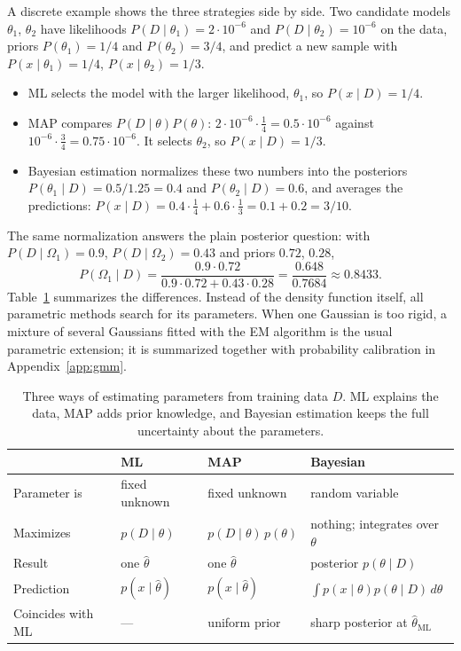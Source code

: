 A discrete example shows the three strategies side by side. Two candidate
models $\theta_1$, $\theta_2$ have likelihoods $P(D\mid\theta_1) = 2\cdot10^{-6}$
and $P(D\mid\theta_2) = 10^{-6}$ on the data, priors $P(\theta_1) = 1/4$ and
$P(\theta_2) = 3/4$, and predict a new sample with
$P(x\mid\theta_1) = 1/4$, $P(x\mid\theta_2) = 1/3$.
\begin{itemize}
  \item ML selects the model with the larger likelihood, $\theta_1$, so
        $P(x\mid D) = 1/4$.
  \item MAP compares $P(D\mid\theta)P(\theta)$:
        $2\cdot10^{-6}\cdot\frac14 = 0.5\cdot10^{-6}$ against
        $10^{-6}\cdot\frac34 = 0.75\cdot10^{-6}$. It selects $\theta_2$, so
        $P(x\mid D) = 1/3$.
  \item Bayesian estimation normalizes these two numbers into the posteriors
        $P(\theta_1\mid D) = 0.5/1.25 = 0.4$ and $P(\theta_2\mid D) = 0.6$, and
        averages the predictions:
        $P(x\mid D) = 0.4\cdot\frac14 + 0.6\cdot\frac13 = 0.1 + 0.2 = 3/10$.
\end{itemize}
\noindent
The same normalization answers the plain posterior question: with
$P(D\mid\Omega_1) = 0.9$, $P(D\mid\Omega_2) = 0.43$ and priors $0.72$, $0.28$,
\begin{equation}
  P(\Omega_1\mid D) = \frac{0.9\cdot0.72}{0.9\cdot0.72 + 0.43\cdot0.28}
  = \frac{0.648}{0.7684}\approx 0.8433 .
\end{equation}
\noindent
Table~\ref{tab:ml-map-bayes} summarizes the differences. Instead of the density
function itself, all parametric methods search for its parameters.
When one Gaussian is too rigid, a mixture of several Gaussians fitted with
the EM algorithm is the usual parametric extension; it is summarized together
with probability calibration in Appendix~\ref{app:gmm}.

\begin{table}[ht]
  \centering
  \begin{tabular}{@{}lp{3.6cm}p{3.4cm}p{3.6cm}@{}}
    \toprule
    & ML & MAP & Bayesian \\
    \midrule
    Parameter is & fixed unknown & fixed unknown & random variable \\
    Maximizes & $p(D\mid\theta)$ & $p(D\mid\theta)\,p(\theta)$ &
      nothing; integrates over $\theta$ \\
    Result & one $\hat\theta$ & one $\hat\theta$ & posterior $p(\theta\mid D)$ \\
    Prediction & $p(x\mid\hat\theta)$ & $p(x\mid\hat\theta)$ &
      $\int p(x\mid\theta)p(\theta\mid D)\,d\theta$ \\
    Coincides with ML & --- & uniform prior & sharp posterior at $\hat\theta_{\mathrm{ML}}$ \\
    \bottomrule
  \end{tabular}
  \caption{Three ways of estimating parameters from training data $D$. ML
  explains the data, MAP adds prior knowledge, and Bayesian estimation keeps
  the full uncertainty about the parameters.}
  \label{tab:ml-map-bayes}
\end{table}

